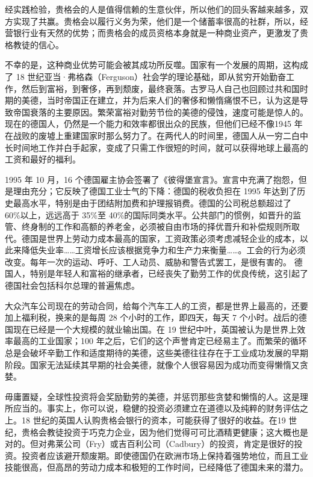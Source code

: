 经实践检验，贵格会的人是值得信赖的生意伙伴，所以他们的回头客越来越多，双方实现了共赢。贵格会以履行义务为荣，他们是一个储蓄率很高的社群，所以，经营银行业有天然的优势；而贵格会的成员资格本身就是一种商业资产，更激发了贵格教徒的信心。

不幸的是，这种商业优势可能会被其成功所反噬。国家有一个发展的周期，这构成了 18 世纪亚当·弗格森（Ferguson）社会学的理论基础，即从贫穷开始勤奋工作，然后到富裕，到奢侈，再到颓废，最终衰落。古罗马人自己也回顾过共和国时期的美德，当时帝国正在建立，并为后来人们的奢侈和懒惰痛恨不已，认为这是导致帝国衰落的主要原因。繁荣富裕对勤劳节俭的美德的侵蚀，速度可能是惊人的。现在的德国人，仍然是一个能力和效率都很出众的民族，但他们已经不像1945 年在战败的废墟上重建国家时那么努力了。在两代人的时间里，德国人从一穷二白中长时间地工作并白手起家，变成了只需工作很短的时间，就可以获得地球上最高的工资和最好的福利。

1995 年 10 月，16 个德国雇主协会签署了《彼得堡宣言》。宣言中充满了抱怨，但是理由充分；它反映了德国工业士气的下降：德国的税收负担在 1995 年达到了历史最高水平，特别是由于团结附加费和护理报销费。德国的公司税总额超过了 60\%以上，远远高于 35\%至 40\%的国际同类水平。公共部门的惯例，如晋升的监管、终身制的工作和高额的养老金，必须被自由市场的择优晋升和补偿规则所取代。德国是世界上劳动力成本最高的国家，工资政策必须考虑减轻企业的成本，以此来降低失业率……工资增长应该根据竞争力和生产力来衡量……。工会的行为必须改变。每年一次的运动、呼吁、工人动员、威胁和警告式罢工，是很有害的。 德国人，特别是年轻人和富裕的继承者，已经丧失了勤劳工作的优良传统，这引起了德国社会包括科尔总理的普遍焦虑。

大众汽车公司现在的劳动合同，给每个汽车工人的工资，都是世界上最高的，还要加上福利税，换来的是每周 28 个小时的工作，即四天，每天 7 个小时。战后的德国现在已经是一个大规模的就业输出国。在 19 世纪中叶，英国被认为是世界上效率最高的工业国家；100 年之后，它们的这个声誉肯定已经易主了。而繁荣的循环总是会破坏辛勤工作和适度期待的美德，这些美德往往存在于工业成功发展的早期阶段。国家无法延续其早期的社会美德，就像个人很容易因为成功而变得懒惰又贪婪。

毋庸置疑，全球性投资将会奖励勤劳的美德，并惩罚那些贪婪和懒惰的人。这是理所应当的。事实上，你可以说，稳健的投资必须建立在道德以及纯粹的财务评估之上。18 世纪的英国人认购贵格会银行的资本，可能获得了很好的收益。在19 世纪，贵格会教徒投资于巧克力企业，因为他们觉得可可比酒精更健康；这大概也是对的。但对弗莱公司（Fry）或吉百利公司（Cadbury）的投资，肯定是很好的投资。投资者应该避开颓废期。即使德国仍在欧洲市场上保持着强势地位，而且工业技能很高，但高昂的劳动力成本和极短的工作时间，已经降低了德国未来的潜力。

